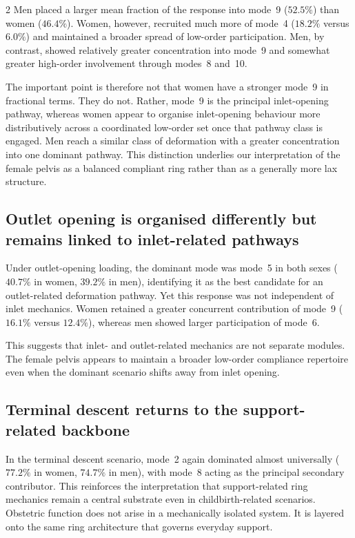 \documentclass[openacc]{rsproca_new}
\begin{document}
\begin{multicols}{2}
Men placed a larger mean fraction of the response into mode~9 ($52.5\%$) than women ($46.4\%$). Women, however, recruited much more of mode~4 ($18.2\%$ versus $6.0\%$) and maintained a broader spread of low-order participation. Men, by contrast, showed relatively greater concentration into mode~9 and somewhat greater high-order involvement through modes~8 and~10.

The important point is therefore not that women have a stronger mode~9 in fractional terms. They do not. Rather, mode~9 is the principal inlet-opening pathway, whereas women appear to organise inlet-opening behaviour more distributively across a coordinated low-order set once that pathway class is engaged. Men reach a similar class of deformation with a greater concentration into one dominant pathway. This distinction underlies our interpretation of the female pelvis as a balanced compliant ring rather than as a generally more lax structure.

\subsection{Outlet opening is organised differently but remains linked to inlet-related pathways}

Under outlet-opening loading, the dominant mode was mode~5 in both sexes ($40.7\%$ in women, $39.2\%$ in men), identifying it as the best candidate for an outlet-related deformation pathway. Yet this response was not independent of inlet mechanics. Women retained a greater concurrent contribution of mode~9 ($16.1\%$ versus $12.4\%$), whereas men showed larger participation of mode~6.

This suggests that inlet- and outlet-related mechanics are not separate modules. The female pelvis appears to maintain a broader low-order compliance repertoire even when the dominant scenario shifts away from inlet opening.

\subsection{Terminal descent returns to the support-related backbone}

In the terminal descent scenario, mode~2 again dominated almost universally ($77.2\%$ in women, $74.7\%$ in men), with mode~8 acting as the principal secondary contributor. This reinforces the interpretation that support-related ring mechanics remain a central substrate even in childbirth-related scenarios. Obstetric function does not arise in a mechanically isolated system. It is layered onto the same ring architecture that governs everyday support.


\end{multicols}
\end{document}
